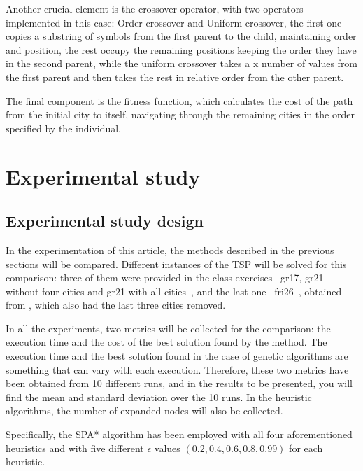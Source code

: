 \documentclass[runningheads]{llncs}
\begin{document}
Another crucial element is the crossover operator, with two operators implemented in this case: Order crossover and Uniform crossover, the first one copies a substring of symbols from the first parent to the child, maintaining order and position, the rest occupy the remaining positions keeping the order they have in the second parent, while the uniform crossover takes a x number of values from the first parent and then takes the rest in relative order from the other parent.

The final component is the fitness function, which calculates the cost of the path from the initial city to itself, navigating through the remaining cities in the order specified by the individual.

% 
%
\section{Experimental study}
\subsection{Experimental study design}
In the experimentation of this article, the methods described in the previous sections will be compared. Different instances of the TSP will be solved for this comparison: three of them were provided in the class exercises --gr17, gr21 without four cities and gr21 with all cities--, and the last one --fri26--, obtained from \cite{tsplib95}, which also had the last three cities removed.

In all the experiments, two metrics will be collected for the comparison: the execution time and the cost of the best solution found by the method. The execution time and the best solution found in the case of genetic algorithms are something that can vary with each execution. Therefore, these two metrics have been obtained from 10 different runs, and in the results to be presented, you will find the mean and standard deviation over the 10 runs. In the heuristic algorithms, the number of expanded nodes will also be collected.

Specifically, the SPA* algorithm has been employed with all four aforementioned heuristics and with five different $\epsilon$ values $(0.2, 0.4, 0.6, 0.8, 0.99)$ for each heuristic.
\end{document}
